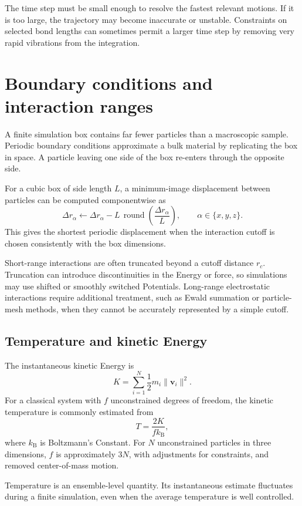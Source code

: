 \documentclass[a4paper, 10pt, onepage]{elegantbook}
\begin{document}
{The time step must be small enough to resolve the fastest relevant motions.
If it is too large, the trajectory may become inaccurate or unstable.
Constraints on selected bond lengths can sometimes permit a larger time
step by removing very rapid vibrations from the integration.

\section{Boundary conditions and interaction ranges}

A finite simulation box contains far fewer particles than a macroscopic
sample. Periodic boundary conditions approximate a bulk material by
replicating the box in space. A particle leaving one side of the box
re-enters through the opposite side.

For a cubic box of side length \(L\), a minimum-image displacement between
particles can be computed componentwise as
\[
\Delta r_\alpha
\leftarrow
\Delta r_\alpha -
L\,\operatorname{round}\!\left(\frac{\Delta r_\alpha}{L}\right),
\qquad
\alpha\in\{x,y,z\}.
\]
This gives the shortest periodic displacement when the interaction cutoff
is chosen consistently with the box dimensions.

Short-range interactions are often truncated beyond a cutoff distance
\(r_c\). Truncation can introduce discontinuities in the Energy or force,
so simulations may use shifted or smoothly switched Potentials. Long-range
electrostatic interactions require additional treatment, such as Ewald
summation or particle-mesh methods, when they cannot be accurately
represented by a simple cutoff.

\subsection{Temperature and kinetic Energy}

The instantaneous kinetic Energy is
\[
K = \sum_{i=1}^{N}\frac{1}{2}m_i\lVert\bm{v}_i\rVert^2.
\]
For a classical system with \(f\) unconstrained degrees of freedom, the
kinetic temperature is commonly estimated from
\[
T = \frac{2K}{f k_{\mathrm{B}}},
\]
where \(k_{\mathrm{B}}\) is Boltzmann's Constant. For \(N\) unconstrained
particles in three dimensions, \(f\) is approximately \(3N\), with
adjustments for constraints, and removed center-of-mass motion.

Temperature is an ensemble-level quantity. Its instantaneous estimate
fluctuates during a finite simulation, even when the average temperature
is well controlled.

}
\end{document}
